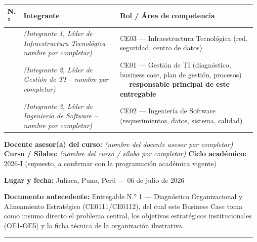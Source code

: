 \documentclass[11pt,a4paper]{article}
\begin{document}
{\small
\begin{longtable}[]{@{}
  >{\raggedright\arraybackslash}p{}
  >{\raggedright\arraybackslash}p{}
  >{\raggedright\arraybackslash}p{}@{}}
\toprule\noalign{}
\begin{minipage}[b]{\linewidth}\raggedright
N.°
\end{minipage} & \begin{minipage}[b]{\linewidth}\raggedright
Integrante
\end{minipage} & \begin{minipage}[b]{\linewidth}\raggedright
Rol / Área de competencia
\end{minipage} \\
\midrule\noalign{}
\endhead
\bottomrule\noalign{}
\endlastfoot
1 & \textit{(Integrante 1, Líder de Infraestructura Tecnológica -- nombre por completar)} & CE03 --- Infraestructura Tecnológica (red, seguridad, centro de datos) \\
2 & \textit{(Integrante 2, Líder de Gestión de TI -- nombre por completar)} & CE01 --- Gestión de TI (diagnóstico, business case, plan de gestión, procesos) --- \textbf{responsable principal de este entregable} \\
3 & \textit{(Integrante 3, Líder de Ingeniería de Software -- nombre por completar)} & CE02 --- Ingeniería de Software (requerimientos, datos, sistema, calidad) \\
\end{longtable}
}

\textbf{Docente asesor(a) del curso:} \textit{(nombre del docente asesor por completar)}
\textbf{Curso / Sílabo:} \textit{(nombre del curso / s\'ilabo por completar)}
\textbf{Ciclo académico:} 2026-I (supuesto, a confirmar con la programación académica vigente)

\textbf{Lugar y fecha:} Juliaca, Puno, Perú --- 06 de julio de 2026

\textbf{Documento antecedente:} Entregable N.° 1 --- Diagnóstico Organizacional y Alineamiento Estratégico (CE0111/CE0112), del cual este Business Case toma como insumo directo el problema central, los objetivos estratégicos institucionales (OE1-OE5) y la ficha técnica de la organización ilustrativa.

\begin{center}\rule{0.5\linewidth}{0.5pt}\end{center}
\end{document}
